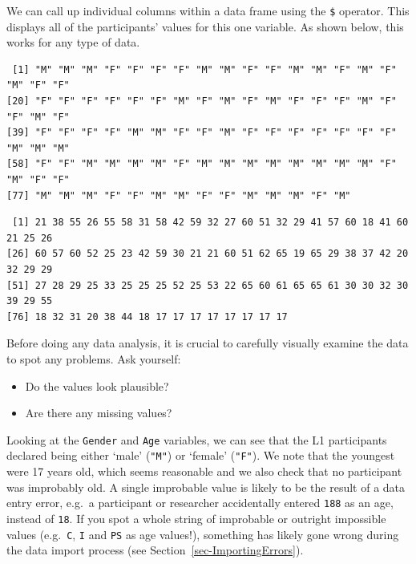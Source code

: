 \documentclass[
  letterpaper,
  DIV=11,
  numbers=noendperiod]{scrreprt}
\newenvironment{Shaded}{\begin{snugshade}}{\end{snugshade}}
\newcommand{\NormalTok}[1]{\textcolor[rgb]{0.00,0.23,0.31}{#1}}
\newcommand{\SpecialCharTok}[1]{\textcolor[rgb]{0.37,0.37,0.37}{#1}}
\providecommand{\tightlist}{%
  \setlength{\itemsep}{0pt}\setlength{\parskip}{0pt}}
\begin{document}
We can call up individual columns within a data frame using the
\texttt{\$} operator. This displays all of the participants' values for
this one variable. As shown below, this works for any type of data.

\begin{Shaded}
\end{Shaded}

\begin{verbatim}
 [1] "M" "M" "M" "F" "F" "F" "F" "M" "M" "F" "F" "M" "M" "F" "M" "F" "M" "F" "F"
[20] "F" "F" "F" "F" "F" "F" "M" "F" "M" "F" "M" "F" "F" "F" "M" "F" "F" "M" "F"
[39] "F" "F" "F" "F" "M" "M" "F" "F" "M" "F" "F" "F" "F" "F" "F" "F" "M" "M" "M"
[58] "F" "F" "M" "M" "M" "M" "F" "M" "M" "M" "M" "M" "M" "M" "M" "F" "M" "F" "F"
[77] "M" "M" "M" "F" "F" "M" "M" "F" "F" "M" "M" "M" "F" "M"
\end{verbatim}

\begin{Shaded}
\end{Shaded}

\begin{verbatim}
 [1] 21 38 55 26 55 58 31 58 42 59 32 27 60 51 32 29 41 57 60 18 41 60 21 25 26
[26] 60 57 60 52 25 23 42 59 30 21 21 60 51 62 65 19 65 29 38 37 42 20 32 29 29
[51] 27 28 29 25 33 25 25 25 52 25 53 22 65 60 61 65 65 61 30 30 32 30 39 29 55
[76] 18 32 31 20 38 44 18 17 17 17 17 17 17 17 17
\end{verbatim}

Before doing any data analysis, it is crucial to carefully visually
examine the data to spot any problems. Ask yourself:

\begin{itemize}
\tightlist
\item
  Do the values look plausible?
\item
  Are there any missing values?
\end{itemize}

Looking at the \texttt{Gender} and \texttt{Age} variables, we can see
that the L1 participants declared being either `male' (\texttt{"M"}) or
`female' (\texttt{"F"}). We note that the youngest were 17 years old,
which seems reasonable and we also check that no participant was
improbably old. A single improbable value is likely to be the result of
a data entry error, e.g.~a participant or researcher accidentally
entered \texttt{188} as an age, instead of \texttt{18}. If you spot a
whole string of improbable or outright impossible values
(e.g.~\texttt{C}, \texttt{I} and \texttt{PS} as age values!), something
has likely gone wrong during the data import process (see
Section~\ref{sec-ImportingErrors}).
\end{document}
